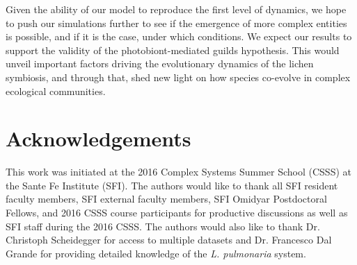 \documentclass[fleqn,10pt]{wlscirep}
\begin{document}
Given the ability of our model to reproduce the first level of dynamics, we hope to push our simulations further to see if the emergence of more complex entities is possible, and if it is the case, under which conditions. We expect our results to support the validity of the photobiont-mediated guilds hypothesis. This would unveil important factors driving the evolutionary dynamics of the lichen symbiosis, and through that, shed new light on how species co-evolve in complex ecological communities.

\section*{Acknowledgements}
This work was initiated at the 2016 Complex Systems Summer School (CSSS) at the Sante Fe Institute (SFI). The authors would like to thank all SFI resident faculty members, SFI external faculty members, SFI Omidyar Postdoctoral Fellows, and 2016 CSSS course participants for productive discussions as well as SFI staff during the 2016 CSSS. The authors would also like to thank Dr. Christoph Scheidegger for access to multiple datasets and Dr. Francesco Dal Grande for providing detailed knowledge of the \emph{L. pulmonaria} system. 


\end{document}
